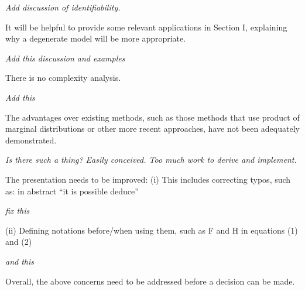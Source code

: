 \documentclass{article}
\newenvironment{review}[0]{\begin{itshape}\color{Gray}\noindent}{\end{itshape}\vspace{0.4cm}}
\newenvironment{response}[0]{\noindent}{\vspace{0.4cm}}
\newcommand{\meta}[1]{{\color{red}\em #1}}
\begin{document}
\begin{response}
 \meta{Add discussion of identifiability.}
\end{response}

\begin{review}
It will be helpful to provide some relevant applications in Section I, explaining why a degenerate model will be more appropriate.
\end{review}

\begin{response}
 \meta{Add this discussion and examples}
\end{response}


\begin{review}
There is no complexity analysis.
\end{review}

\begin{response}
 \meta{Add this}
\end{response}

\begin{review}
The advantages over existing methods, such as those methods that use product of marginal distributions or other more recent approaches, have not been adequately demonstrated.
\end{review}

\begin{response}
 \meta{Is there such a thing? Easily conceived. Too much work to derive and implement.}
\end{response}

\begin{review}
The presentation needs to be improved:
(i) This includes correcting typos, such as: in abstract ``it is possible deduce''
\end{review}

\begin{response}
 \meta{fix this}
\end{response}

\begin{review}
(ii) Defining notations before/when using them, such as F and H in equations (1) and (2)
\end{review}

\begin{response}
 \meta{and this}
\end{response}

\begin{review}
Overall, the above concerns need to be addressed before a decision can be made.
\end{review}
\end{document}
